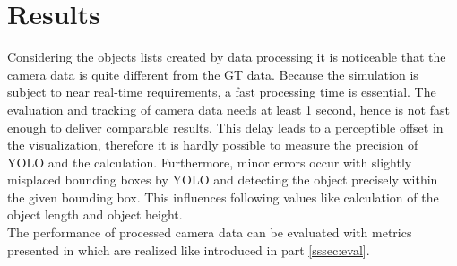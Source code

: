 \section{Results}\label{Results}

	Considering the objects lists created by data processing it is noticeable that the camera data is quite different from the \ac{GT} data. Because the simulation is subject to near real-time requirements, a fast processing time is essential. The evaluation and tracking of camera data needs at least 1 second, hence is not fast enough to deliver comparable results. This delay leads to a perceptible offset in the visualization, therefore it is hardly possible to measure the precision of \ac{YOLO} and the calculation.
	Furthermore, minor errors occur with slightly misplaced bounding boxes by \ac{YOLO} and detecting the object precisely within the given bounding box. This influences following values like calculation of the object length and object height.\\
	
	The performance of processed camera data can be evaluated with metrics presented in \cite{Reway} which are realized like introduced in part \ref{sssec:eval}.
%	
